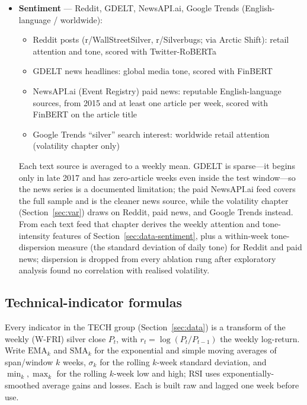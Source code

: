 \documentclass[12pt, a4paper]{article}
\begin{document}
\begin{itemize}
    \item \textbf{Sentiment} --- Reddit, GDELT, NewsAPI.ai, Google Trends (English-language / worldwide):
    \begin{itemize}[nosep]
        \item Reddit posts (r/WallStreetSilver, r/Silverbugs; via Arctic Shift): retail attention and tone, scored with Twitter-RoBERTa \parencite{loureiro2022}
        \item GDELT news headlines: global media tone, scored with FinBERT \parencite{araci2019}
        \item NewsAPI.ai (Event Registry) paid news: reputable English-language sources, from 2015 and at least one article per week, scored with FinBERT \parencite{araci2019} on the article title
        \item Google Trends ``silver'' search interest: worldwide retail attention (volatility chapter only)
    \end{itemize}
    Each text source is averaged to a weekly mean. GDELT is sparse---it begins only in late
    2017 and has zero-article weeks even inside the test window---so the news series is a
    documented limitation; the paid NewsAPI.ai feed covers the full sample and is the
    cleaner news source, while the volatility chapter (Section~\ref{sec:var}) draws on
    Reddit, paid news, and Google Trends instead. From each text feed that chapter derives
    the weekly attention and tone-intensity features of Section~\ref{sec:data-sentiment},
    plus a within-week tone-dispersion measure (the standard deviation of daily tone)
    for Reddit and paid news; dispersion is dropped from every ablation rung after
    exploratory analysis found no correlation with realised volatility.

\end{itemize}

\subsection{Technical-indicator formulas}
\label{app:tech}

Every indicator in the TECH group (Section~\ref{sec:data}) is a transform of the weekly
(W-FRI) silver close \(P_t\), with \(r_t=\log(P_t/P_{t-1})\) the weekly log-return. Write
\(\mathrm{EMA}_k\) and \(\mathrm{SMA}_k\) for the exponential and simple moving averages of
span/window \(k\) weeks, \(\sigma_k\) for the rolling \(k\)-week standard deviation, and
\(\min_k,\max_k\) for the rolling \(k\)-week low and high; RSI uses exponentially-smoothed
average gains and losses. Each is built raw and lagged one week before use.
\end{document}
